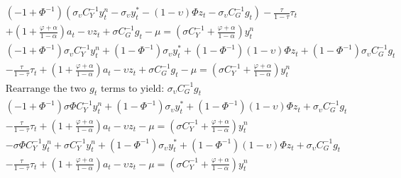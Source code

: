 \begin{align}
    &(- 1 + \Phi^{-1}) (\sigma_\upsilon C_Y^{-1} y^n_t - \sigma_\upsilon y^*_t - (1-\upsilon)\Phi z_t- \sigma_\upsilon C_G^{-1} g_t) - \frac{\tau}{1-\tau}\tau_t  \nonumber \\
        &+ \left(1 + \frac{\varphi + \alpha}{1-\alpha}\right)a_t - \upsilon z_t + \sigma C_G^{-1} g_t-\mu = \left(\sigma C_Y^{-1} + \frac{\varphi + \alpha}{1-\alpha}\right)y^n_t\\
    &(- 1 + \Phi^{-1})\sigma_\upsilon C_Y^{-1} y^n_t +(1 - \Phi^{-1}) \sigma_\upsilon y^*_t + (1 - \Phi^{-1}) (1-\upsilon)\Phi z_t + (1 - \Phi^{-1}) \sigma_\upsilon C_G^{-1} g_t \nonumber \\
        &- \frac{\tau}{1-\tau}\tau_t  + \left(1 + \frac{\varphi + \alpha}{1-\alpha}\right)a_t - \upsilon z_t + \sigma C_G^{-1} g_t -\mu = \left(\sigma C_Y^{-1} + \frac{\varphi + \alpha}{1-\alpha}\right)y^n_t\\
    &\text{Rearrange the two $g_t$ terms to yield: $\sigma_\upsilon C_G^{-1}g_t$} \nonumber\\
    &(- 1 + \Phi^{-1})\sigma \Phi C_Y^{-1} y^n_t +(1 - \Phi^{-1}) \sigma_\upsilon y^*_t + (1 - \Phi^{-1}) (1-\upsilon)\Phi z_t + \sigma_\upsilon C_G^{-1} g_t \nonumber \\
        &- \frac{\tau}{1-\tau}\tau_t  + \left(1 + \frac{\varphi + \alpha}{1-\alpha}\right)a_t - \upsilon z_t -\mu = \left(\sigma C_Y^{-1} + \frac{\varphi + \alpha}{1-\alpha}\right)y^n_t\\
    &-\sigma \Phi C_Y^{-1} y^n_t + \sigma C_Y^{-1} y^n_t +(1 - \Phi^{-1}) \sigma_\upsilon y^*_t + (1 - \Phi^{-1}) (1-\upsilon)\Phi z_t + \sigma_\upsilon C_G^{-1} g_t \nonumber \\
        &- \frac{\tau}{1-\tau}\tau_t  + \left(1 + \frac{\varphi + \alpha}{1-\alpha}\right)a_t - \upsilon z_t -\mu = \left(\sigma C_Y^{-1} + \frac{\varphi + \alpha}{1-\alpha}\right)y^n_t
\end{align}
